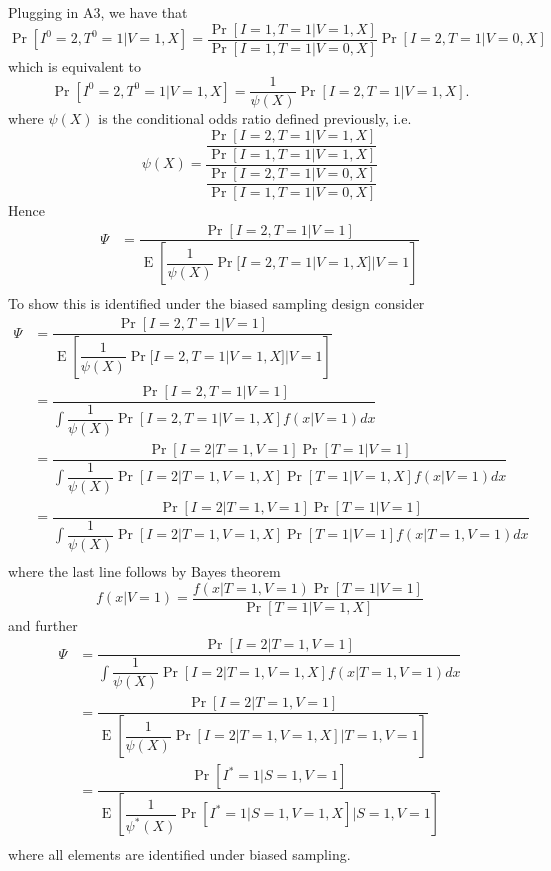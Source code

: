 \documentclass{article}
\DeclareMathOperator{\E}{E}
\begin{document}
Plugging in A3, we have that 
\begin{equation*}
    \Pr[I^0 = 2, T^0 = 1 | V = 1, X] = \dfrac{\Pr[I = 1, T = 1 | V = 1, X]}{\Pr[I = 1, T = 1 | V = 0, X]} \Pr[I = 2, T = 1 | V = 0, X]
\end{equation*}
which is equivalent to 
\begin{equation*}
    \Pr[I^0 = 2, T^0 = 1 | V = 1, X] = \dfrac{1}{\psi(X)} \Pr[I = 2, T = 1 | V = 1, X].
\end{equation*}
where $\psi(X)$ is the conditional odds ratio defined previously, i.e.
\begin{equation*}
    \psi(X) = \dfrac{\dfrac{\Pr[I = 2, T = 1 | V = 1, X]}{\Pr[I = 1, T = 1 | V = 1, X]}}{\dfrac{\Pr[I = 2, T = 1 | V = 0, X]}{\Pr[I = 1, T = 1 | V = 0, X]}}
\end{equation*}
Hence
\begin{align*}
    \Psi &= \dfrac{\Pr[I = 2, T = 1 | V = 1]}{\E\left[\dfrac{1}{\psi(X)} \Pr[I = 2, T = 1 | V = 1, X] | V = 1\right]} \\
\end{align*}
To show this is identified under the biased sampling design consider
\begin{align*}
    \Psi &= \dfrac{\Pr[I = 2, T = 1 | V = 1]}{\E\left[\dfrac{1}{\psi(X)} \Pr[I = 2, T = 1 | V = 1, X] | V = 1\right]} \\
    &= \dfrac{\Pr[I = 2, T = 1 | V = 1]}{\int \dfrac{1}{\psi(X)} \Pr[I = 2, T = 1 | V = 1, X] f(x | V = 1) dx} \\
    &= \dfrac{\Pr[I = 2 | T = 1, V = 1] \Pr[T = 1 | V = 1]}{\int \dfrac{1}{\psi(X)} \Pr[I = 2 | T = 1, V = 1, X] \Pr[T = 1 | V = 1, X]  f(x | V = 1) dx} \\
    &= \dfrac{\Pr[I = 2 | T = 1, V = 1] \Pr[T = 1 | V = 1]}{\int \dfrac{1}{\psi(X)} \Pr[I = 2 | T = 1, V = 1, X] \Pr[T = 1 | V = 1]  f(x | T = 1, V = 1) dx} \\
\end{align*}
where the last line follows by Bayes theorem 
\begin{equation*}
    f(x | V = 1) = \dfrac{f(x | T = 1, V = 1)\Pr[T = 1 | V = 1]}{\Pr[T = 1 | V = 1, X]}
\end{equation*}
and further
\begin{align*}
    \Psi &= \dfrac{\Pr[I = 2 | T = 1, V = 1]}{\int \dfrac{1}{\psi(X)} \Pr[I = 2 | T = 1, V = 1, X] f(x | T = 1, V = 1) dx} \\
    &= \dfrac{\Pr[I = 2 | T = 1, V = 1]}{\E\left[\dfrac{1}{\psi(X)} \Pr[I = 2 | T = 1, V = 1, X] \bigg| T = 1, V = 1\right]} \\
    &= \dfrac{\Pr[I^* = 1 | S = 1, V = 1]}{\E\left[\dfrac{1}{\psi^*(X)} \Pr[I^* = 1 | S = 1, V = 1, X] \bigg| S = 1, V = 1\right]} \\
\end{align*}
where all elements are identified under biased sampling.
\end{document}
